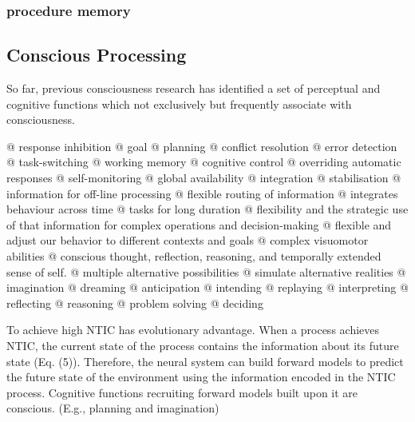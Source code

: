 \documentclass[utf8]{article}
\newenvironment{ants}
			{
			 \begin{easylist}[itemize]
		 	}
			{
			\end{easylist}
			} %
\begin{document}
		\subsubsection{procedure memory}
		
	
		
		\subsection{Conscious Processing}
		So far, previous consciousness research has identified a set of perceptual and cognitive functions which not exclusively but frequently associate with consciousness. 
		
		\begin{ants}
            @ response inhibition 
            @ goal
            @ planning            
            @ conflict resolution
            @ error detection         
            @ task-switching
            @ working memory
            @ cognitive control 
            @ overriding automatic responses
            @ self-monitoring 
            @ global availability 
            @ integration             
            @ stabilisation
            @ information for off-line processing
            @ flexible routing of information
            @ integrates behaviour across time            
            @ tasks for long duration
            @ flexibility and the strategic use of that information for complex operations and decision-making 
            @ flexible and adjust our behavior to different contexts and goals
            @ complex visuomotor abilities
            @ conscious thought, reflection, reasoning, and temporally extended sense of self. 
            @ multiple alternative possibilities
            @ simulate alternative realities 
            @ imagination
            @ dreaming 
            @ anticipation
            @ intending
            @ replaying
            @ interpreting
            @ reflecting
            @ reasoning
            @ problem solving 
            @ deciding            
		\end{ants}
		

		
		To achieve high NTIC has evolutionary advantage. When a process achieves NTIC, the current state of the process contains the information about its future state (Eq. (5)). Therefore, the neural system can build forward models to predict the future state of the environment using the information encoded in the NTIC process. Cognitive functions recruiting forward models built upon it are conscious. (E.g., planning and imagination)
		
\end{document}

